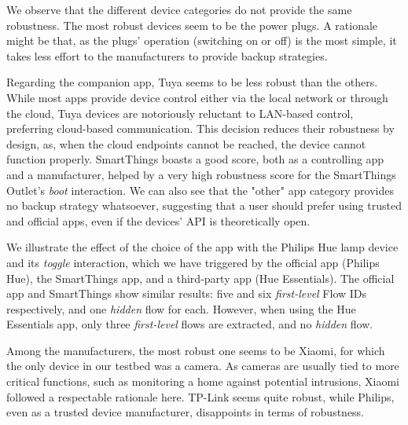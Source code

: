 We observe that the different device categories do not provide the same robustness.
The most robust devices seem to be the power plugs.
A rationale might be that,
as the plugs' operation (switching on or off) is the most simple,
it takes less effort to the manufacturers to provide backup strategies.

Regarding the companion app,
Tuya seems to be less robust than the others.
While most apps provide device control
either via the local network or through the cloud,
Tuya devices are notoriously reluctant to LAN-based control,
preferring cloud-based communication.
This decision reduces their robustness by design,
as, when the cloud endpoints cannot be reached,
the device cannot function properly.
SmartThings boasts a good score,
both as a controlling app and a manufacturer,
helped by a very high robustness score for the SmartThings Outlet's \emph{boot} interaction.
We can also see that the "other" app category provides no backup strategy whatsoever,
suggesting that a user should prefer using trusted and official apps, even if the devices' API is theoretically open.

We illustrate the effect of the choice of the app with the Philips Hue lamp device and its \emph{toggle} interaction,
which we have triggered by the official app (Philips Hue),
the SmartThings app, and a third-party app (Hue Essentials).
The official app and SmartThings show similar results:
five and six \emph{first-level} Flow IDs respectively,
and one \emph{hidden} flow for each.
However, when using the Hue Essentials app,
only three \emph{first-level} flows are extracted,
and no \emph{hidden} flow.



Among the manufacturers,
the most robust one seems to be Xiaomi,
for which the only device in our testbed was a camera.
As cameras are usually tied to more critical functions,
such as monitoring a home against potential intrusions,
Xiaomi followed a respectable rationale here.
TP-Link seems quite robust,
while Philips, even as a trusted device manufacturer,
disappoints in terms of robustness.



